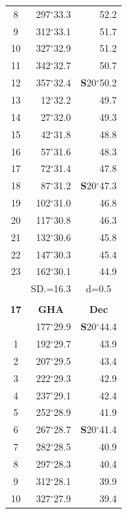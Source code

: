 \documentclass[10pt, a4paper]{report}
\begin{document}
\begin{scriptsize}
\begin{tabular*}{0.2\textwidth}[t]{@{\extracolsep{\fill}}|c|rr|}
8 & 297$^\circ$33.3 & 52.2\\
9 & 312$^\circ$33.1 & \raisebox{0.24ex}{\boldmath$\cdot$~\boldmath$\cdot$~~}51.7\\
10 & 327$^\circ$32.9 & 51.2\\
11 & 342$^\circ$32.7 & 50.7\\[2Pt]
12 & 357$^\circ$32.4 & \textbf{S}20$^\circ$50.2\\
13 & 12$^\circ$32.2 & 49.7\\
14 & 27$^\circ$32.0 & 49.3\\
15 & 42$^\circ$31.8 & \raisebox{0.24ex}{\boldmath$\cdot$~\boldmath$\cdot$~~}48.8\\
16 & 57$^\circ$31.6 & 48.3\\
17 & 72$^\circ$31.4 & 47.8\\[2Pt]
18 & 87$^\circ$31.2 & \textbf{S}20$^\circ$47.3\\
19 & 102$^\circ$31.0 & 46.8\\
20 & 117$^\circ$30.8 & 46.3\\
21 & 132$^\circ$30.6 & \raisebox{0.24ex}{\boldmath$\cdot$~\boldmath$\cdot$~~}45.8\\
22 & 147$^\circ$30.3 & 45.4\\
23 & 162$^\circ$30.1 & 44.9\\
\hline
\rule{0pt}{2.4ex} & \multicolumn{1}{c}{SD.=16.3} & \multicolumn{1}{c|}{d=0.5}\\
\hline
\multicolumn{1}{c}{}\\[-0.5ex]\hline
\multicolumn{1}{|c|}{\rule{0pt}{2.6ex}\textbf{17}} & \multicolumn{1}{c}{\textbf{GHA}} & \multicolumn{1}{c|}{\textbf{Dec}}\\
\hline\rule{0pt}{2.6ex}\noindent
0 & 177$^\circ$29.9 & \textbf{S}20$^\circ$44.4\\
1 & 192$^\circ$29.7 & 43.9\\
2 & 207$^\circ$29.5 & 43.4\\
3 & 222$^\circ$29.3 & \raisebox{0.24ex}{\boldmath$\cdot$~\boldmath$\cdot$~~}42.9\\
4 & 237$^\circ$29.1 & 42.4\\
5 & 252$^\circ$28.9 & 41.9\\[2Pt]
6 & 267$^\circ$28.7 & \textbf{S}20$^\circ$41.4\\
7 & 282$^\circ$28.5 & 40.9\\
8 & 297$^\circ$28.3 & 40.4\\
9 & 312$^\circ$28.1 & \raisebox{0.24ex}{\boldmath$\cdot$~\boldmath$\cdot$~~}39.9\\
10 & 327$^\circ$27.9 & 39.4\\

\end{tabular*}
\end{scriptsize}
\end{document}
